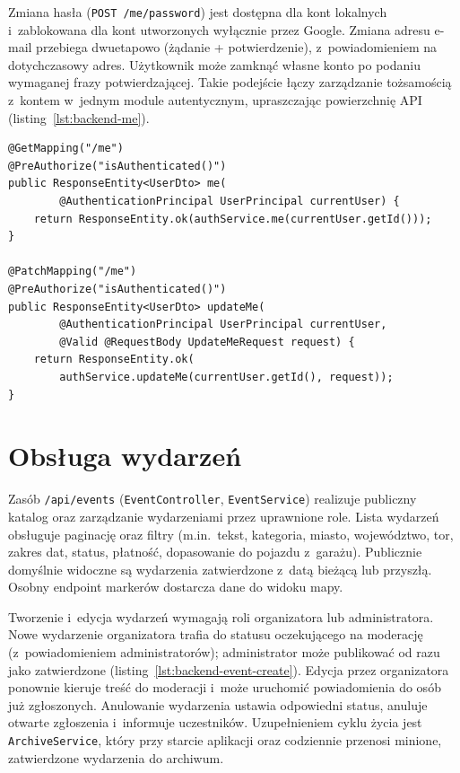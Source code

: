 \documentclass{sprz}
\begin{document}
Zmiana hasła (\texttt{POST /me/password}) jest dostępna dla kont lokalnych i~zablokowana dla kont utworzonych wyłącznie przez Google. Zmiana adresu e-mail przebiega dwuetapowo (żądanie + potwierdzenie), z~powiadomieniem na dotychczasowy adres. Użytkownik może zamknąć własne konto po podaniu wymaganej frazy potwierdzającej. Takie podejście łączy zarządzanie tożsamością z~kontem w~jednym module autentycznym, upraszczając powierzchnię API (listing~\ref{lst:backend-me}).

\begin{lstlisting}[caption={Endpointy profilu w \texttt{AuthController}},label={lst:backend-me}]
@GetMapping("/me")
@PreAuthorize("isAuthenticated()")
public ResponseEntity<UserDto> me(
        @AuthenticationPrincipal UserPrincipal currentUser) {
    return ResponseEntity.ok(authService.me(currentUser.getId()));
}

@PatchMapping("/me")
@PreAuthorize("isAuthenticated()")
public ResponseEntity<UserDto> updateMe(
        @AuthenticationPrincipal UserPrincipal currentUser,
        @Valid @RequestBody UpdateMeRequest request) {
    return ResponseEntity.ok(
        authService.updateMe(currentUser.getId(), request));
}
\end{lstlisting}

\section{Obsługa wydarzeń}
Zasób \texttt{/api/events} (\texttt{EventController}, \texttt{EventService}) realizuje publiczny katalog oraz zarządzanie wydarzeniami przez uprawnione role. Lista wydarzeń obsługuje paginację oraz filtry (m.in.\ tekst, kategoria, miasto, województwo, tor, zakres dat, status, płatność, dopasowanie do pojazdu z~garażu). Publicznie domyślnie widoczne są wydarzenia zatwierdzone z~datą bieżącą lub przyszłą. Osobny endpoint markerów dostarcza dane do widoku mapy.

Tworzenie i~edycja wydarzeń wymagają roli organizatora lub administratora. Nowe wydarzenie organizatora trafia do statusu oczekującego na moderację (z~powiadomieniem administratorów); administrator może publikować od razu jako zatwierdzone (listing~\ref{lst:backend-event-create}). Edycja przez organizatora ponownie kieruje treść do moderacji i~może uruchomić powiadomienia do osób już zgłoszonych. Anulowanie wydarzenia ustawia odpowiedni status, anuluje otwarte zgłoszenia i~informuje uczestników. Uzupełnieniem cyklu życia jest \texttt{ArchiveService}, który przy starcie aplikacji oraz codziennie przenosi minione, zatwierdzone wydarzenia do archiwum.
\end{document}
